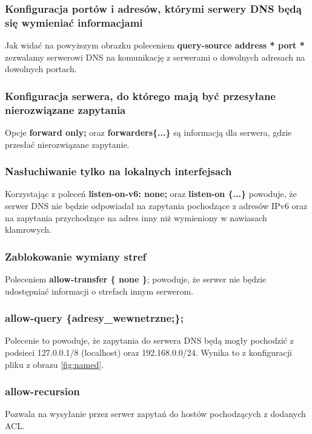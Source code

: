 \documentclass[12pt, a4paper]{article}
\begin{document}
        \subsubsection{Konfiguracja portów i adresów, którymi serwery DNS będą się wymieniać informacjami}
            Jak widać na powyższym obrazku poleceniem \textbf{query-source address * port *} zezwalamy serwerowi DNS na komunikację z serwerami o dowolnych adresach na dowolnych portach.
            
        \subsubsection{Konfiguracja serwera, do którego mają być przesyłane nierozwiązane zapytania}
            Opcje \textbf{forward only;} oraz \textbf{forwarders\{...\}} są informacją dla serwera, gdzie przesłać nierozwiązane zapytanie.
            
        \subsubsection{Nasłuchiwanie tylko na lokalnych interfejsach}
            Korzystając z poleceń \textbf{listen-on-v6: none; } oraz \textbf{listen-on \{...\}} powoduje, że serwer DNS nie będzie odpowiadał na zapytania pochodzące z adresów IPv6 oraz na zapytania przychodzące na adres inny niż wymieniony w nawiasach klamrowych.
        \subsubsection{Zablokowanie wymiany stref}
            Poleceniem \textbf{allow-transfer \{ none \}}; powoduje, że serwer nie będzie udostępniać informacji o strefach innym serwerom.
            
        \subsubsection{allow-query \{adresy\_wewnetrzne;\};}
            Polecenie to powoduje, że zapytania do serwera DNS będą mogły pochodzić z podsieci 127.0.0.1/8 (localhost) oraz 192.168.0.0/24. Wynika to z konfiguracji pliku z obrazu \ref{fig:named}.
            
        \subsubsection{allow-recursion}
            Pozwala na wysyłanie przez serwer zapytań do hostów pochodzących z dodanych ACL.
\end{document}
